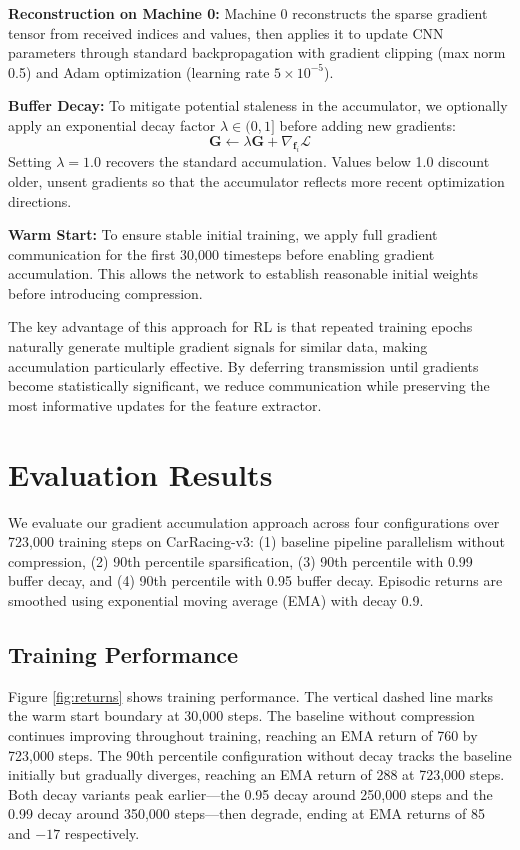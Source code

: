 \documentclass[conference]{IEEEtran}
\begin{document}
\textbf{Reconstruction on Machine 0:} Machine 0 reconstructs the sparse gradient tensor from received indices and values, then applies it to update CNN parameters through standard backpropagation with gradient clipping (max norm 0.5) and Adam optimization (learning rate $5 \times 10^{-5}$).

\textbf{Buffer Decay:} To mitigate potential staleness in the accumulator, we optionally apply an exponential decay factor $\lambda \in (0, 1]$ before adding new gradients:
\begin{equation}
\mathbf{G} \leftarrow \lambda \mathbf{G} + \nabla_{\mathbf{f}_i} \mathcal{L}
\end{equation}
Setting $\lambda = 1.0$ recovers the standard accumulation. Values below 1.0 discount older, unsent gradients so that the accumulator reflects more recent optimization directions.

\textbf{Warm Start:} To ensure stable initial training, we apply full gradient communication for the first 30,000 timesteps before enabling gradient accumulation. This allows the network to establish reasonable initial weights before introducing compression.

The key advantage of this approach for RL is that repeated training epochs naturally generate multiple gradient signals for similar data, making accumulation particularly effective. By deferring transmission until gradients become statistically significant, we reduce communication while preserving the most informative updates for the feature extractor.

\section{Evaluation Results}

We evaluate our gradient accumulation approach across four configurations over 723,000 training steps on CarRacing-v3: (1) baseline pipeline parallelism without compression, (2) 90th percentile sparsification, (3) 90th percentile with 0.99 buffer decay, and (4) 90th percentile with 0.95 buffer decay. Episodic returns are smoothed using exponential moving average (EMA) with decay 0.9.

\subsection{Training Performance}

Figure \ref{fig:returns} shows training performance. The vertical dashed line marks the warm start boundary at 30,000 steps. The baseline without compression continues improving throughout training, reaching an EMA return of 760 by 723,000 steps. The 90th percentile configuration without decay tracks the baseline initially but gradually diverges, reaching an EMA return of 288 at 723,000 steps. Both decay variants peak earlier—the 0.95 decay around 250,000 steps and the 0.99 decay around 350,000 steps—then degrade, ending at EMA returns of 85 and $-17$ respectively.
\end{document}
